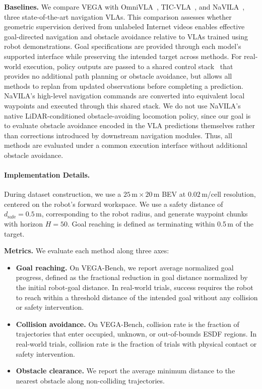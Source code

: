 \noindent \textbf{Baselines.}
We compare VEGA with OmniVLA~\cite{hirose2025omnivlaomnimodalvisionlanguageactionmodel}, TIC-VLA~\cite{huang2026tic}, and NaVILA~\cite{cheng2025navilaleggedrobotvisionlanguageaction}, three state-of-the-art navigation VLAs.
This comparison assesses whether geometric supervision derived from unlabeled Internet videos enables effective goal-directed navigation and obstacle avoidance relative to VLAs trained using robot demonstrations.
Goal specifications are provided through each model's supported interface while preserving the intended target across methods.
For real-world execution, policy outputs are passed to a shared control stack~\cite{seneviratne2026chop} that provides no additional path planning or obstacle avoidance, but allows all methods to replan from updated observations before completing a prediction.
NaVILA's high-level navigation commands are converted into equivalent local waypoints and executed through this shared stack.
We do not use NaVILA's native LiDAR-conditioned obstacle-avoiding locomotion policy, since our goal is to evaluate obstacle avoidance encoded in the VLA predictions themselves rather than corrections introduced by downstream navigation modules.
Thus, all methods are evaluated under a common execution interface without additional obstacle avoidance.

\paragraph{Implementation Details.}
During dataset construction, we use a $25\,\mathrm{m}\times20\,\mathrm{m}$ BEV at $0.02\,\mathrm{m}$/cell resolution, centered on the robot's forward workspace. We use a safety distance of $d_{\mathrm{safe}}=0.5\,\mathrm{m}$, corresponding to the robot radius, and generate waypoint chunks with horizon $H=50$. Goal reaching is defined as terminating within 0.5\,m of the target.

\noindent \textbf{Metrics.}
We evaluate each method along three axes:
\begin{itemize}[noitemsep,topsep=1pt]
    \item \textbf{Goal reaching.}
    On VEGA-Bench, we report average normalized goal progress, defined as the fractional reduction in goal distance normalized by the initial robot-goal distance.
    In real-world trials, success requires the robot to reach within a threshold distance of the intended goal without any collision or safety intervention.

    \item \textbf{Collision avoidance.}
    On VEGA-Bench, collision rate is the fraction of trajectories that enter occupied, unknown, or out-of-bounds ESDF regions.
    In real-world trials, collision rate is the fraction of trials with physical contact or safety intervention.

    \item \textbf{Obstacle clearance.}
    We report the average minimum distance to the nearest obstacle along non-colliding trajectories.
\end{itemize}

